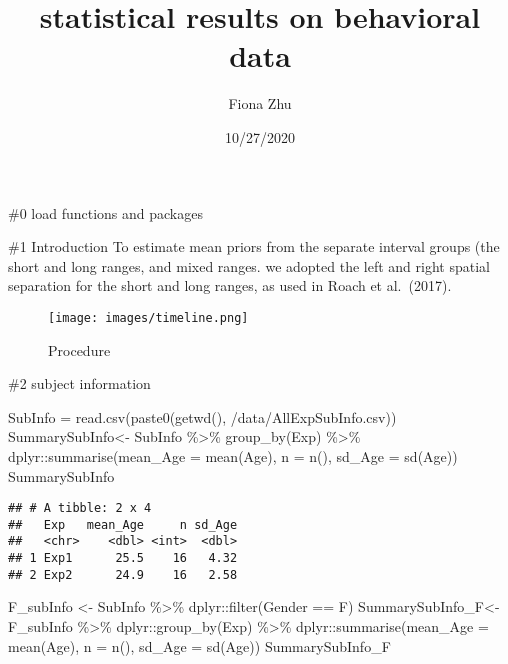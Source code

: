 \documentclass[
]{article}
\title{statistical results on behavioral data}
\author{Fiona Zhu}
\date{10/27/2020}
\newenvironment{Shaded}{\begin{snugshade}}{\end{snugshade}}
\newcommand{\AttributeTok}[1]{\textcolor[rgb]{0.77,0.63,0.00}{#1}}
\newcommand{\FunctionTok}[1]{\textcolor[rgb]{0.00,0.00,0.00}{#1}}
\newcommand{\NormalTok}[1]{#1}
\newcommand{\OtherTok}[1]{\textcolor[rgb]{0.56,0.35,0.01}{#1}}
\newcommand{\SpecialCharTok}[1]{\textcolor[rgb]{0.00,0.00,0.00}{#1}}
\newcommand{\StringTok}[1]{\textcolor[rgb]{0.31,0.60,0.02}{#1}}
\begin{document}
\maketitle

\#0 load functions and packages

\#1 Introduction To estimate mean priors from the separate interval
groups (the short and long ranges, and mixed ranges. we adopted the left
and right spatial separation for the short and long ranges, as used in
Roach et al.~(2017).

\begin{figure}
\centering
\texttt{[image: images/timeline.png]}
\caption{Procedure}
\end{figure}

\#2 subject information

\begin{Shaded}
\begin{Highlighting}[]
\NormalTok{SubInfo }\OtherTok{=} \FunctionTok{read.csv}\NormalTok{(}\FunctionTok{paste0}\NormalTok{(}\FunctionTok{getwd}\NormalTok{(), }\StringTok{\textquotesingle{}/data/AllExpSubInfo.csv\textquotesingle{}}\NormalTok{))}
\NormalTok{SummarySubInfo}\OtherTok{\textless{}{-}}\NormalTok{ SubInfo }\SpecialCharTok{\%\textgreater{}\%} \FunctionTok{group\_by}\NormalTok{(Exp) }\SpecialCharTok{\%\textgreater{}\%}
\NormalTok{  dplyr}\SpecialCharTok{::}\FunctionTok{summarise}\NormalTok{(}\AttributeTok{mean\_Age =} \FunctionTok{mean}\NormalTok{(Age),}
                   \AttributeTok{n =} \FunctionTok{n}\NormalTok{(),}
                   \AttributeTok{sd\_Age =} \FunctionTok{sd}\NormalTok{(Age))}
\NormalTok{SummarySubInfo}
\end{Highlighting}
\end{Shaded}

\begin{verbatim}
## # A tibble: 2 x 4
##   Exp   mean_Age     n sd_Age
##   <chr>    <dbl> <int>  <dbl>
## 1 Exp1      25.5    16   4.32
## 2 Exp2      24.9    16   2.58
\end{verbatim}

\begin{Shaded}
\begin{Highlighting}[]
\NormalTok{F\_subInfo }\OtherTok{\textless{}{-}}\NormalTok{ SubInfo }\SpecialCharTok{\%\textgreater{}\%}\NormalTok{ dplyr}\SpecialCharTok{::}\FunctionTok{filter}\NormalTok{(Gender }\SpecialCharTok{==} \StringTok{\textquotesingle{}F\textquotesingle{}}\NormalTok{)}
\NormalTok{SummarySubInfo\_F}\OtherTok{\textless{}{-}}\NormalTok{ F\_subInfo }\SpecialCharTok{\%\textgreater{}\%}
\NormalTok{  dplyr}\SpecialCharTok{::}\FunctionTok{group\_by}\NormalTok{(Exp) }\SpecialCharTok{\%\textgreater{}\%}
\NormalTok{  dplyr}\SpecialCharTok{::}\FunctionTok{summarise}\NormalTok{(}\AttributeTok{mean\_Age =} \FunctionTok{mean}\NormalTok{(Age),}
                   \AttributeTok{n =} \FunctionTok{n}\NormalTok{(),}
                   \AttributeTok{sd\_Age =} \FunctionTok{sd}\NormalTok{(Age))}
\NormalTok{SummarySubInfo\_F}
\end{Highlighting}
\end{Shaded}
\end{document}
